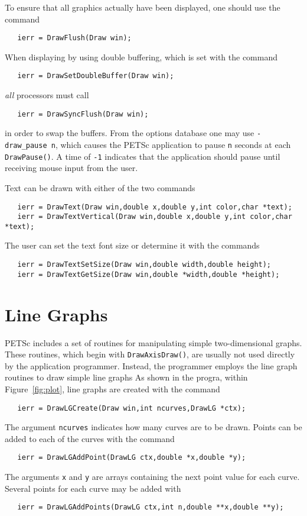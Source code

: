 To ensure that all graphics actually have been displayed, one should use 
 the
command 
\begin{verbatim}
   ierr = DrawFlush(Draw win);
\end{verbatim}
When displaying by using double buffering, which is set with the
command  
\begin{verbatim}
   ierr = DrawSetDoubleBuffer(Draw win);
\end{verbatim}
{\em all} processors must call 
\begin{verbatim}
   ierr = DrawSyncFlush(Draw win);
\end{verbatim}
in order to swap the buffers. From the options database one may use 
{\tt -draw\_pause n}, which  causes the PETSc application 
to pause {\tt n} seconds at each {\tt DrawPause()}. A time of {\tt -1}
indicates that the application should pause until receiving mouse 
input from the user.

Text can be drawn with either of the two 
commands  
\begin{verbatim}
   ierr = DrawText(Draw win,double x,double y,int color,char *text);
   ierr = DrawTextVertical(Draw win,double x,double y,int color,char *text);
\end{verbatim}
The user can set the text font size or determine it with the 
commands  
\begin{verbatim}
   ierr = DrawTextSetSize(Draw win,double width,double height);
   ierr = DrawTextGetSize(Draw win,double *width,double *height);
\end{verbatim}

\section{Line Graphs}
PETSc includes a set of routines for manipulating simple two-dimensional
graphs. These routines, which begin with {\tt DrawAxisDraw()}, are usually 
not used directly by the application programmer.  Instead, the programmer 
employs the line graph routines to draw simple line graphs
As shown in the progra, within Figure~\ref{fig:plot}, line graphs 
are created with the command  
\begin{verbatim}
   ierr = DrawLGCreate(Draw win,int ncurves,DrawLG *ctx);
\end{verbatim}
The argument {\tt ncurves} indicates how many curves are to be drawn.
Points can be added to each of the curves with the 
command 
\begin{verbatim}
   ierr = DrawLGAddPoint(DrawLG ctx,double *x,double *y);
\end{verbatim}
The arguments {\tt x} and {\tt y} are arrays containing the next 
point value for each curve.
Several points for each curve may be added with 
\begin{verbatim}
   ierr = DrawLGAddPoints(DrawLG ctx,int n,double **x,double **y);
\end{verbatim}

